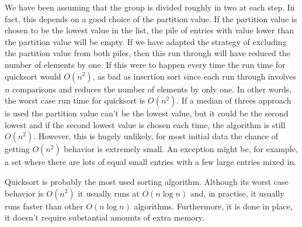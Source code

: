 \documentclass[11pt,a4paper]{scrartcl}
\begin{document}
We have been assuming that the group is divided roughly in two at each
step. In fact, this depends on a good choice of the partition
value. If the partition value is chosen to be the lowest value in the
list, the pile of entries with value lower than the partition value
will be empty. If we have adapted the strategy of excluding the
partition value from both piles, then this run through will have
reduced the number of elements by one. If this were to happen every
time the run time for quicksort would $O(n^2)$, as bad as insertion
sort since each run through involves $n$ comparisons and reduces the
number of elements by only one. In other words, the worst case run
time for quicksort is $O(n^2)$. If a median of threes approach is used
the partition value can't be the lowest value, but it could be the
second lowest and if the second lowest value is chosen each time, the
algorithm is still $O(n^2)$. However, this is hugely unlikely, for
most initial data the chance of getting $O(n^2)$ behavior is extremely
small. An exception might be, for example, a set where there are lots
of equal small entries with a few large entries mixed in.

Quicksort is probably the most used sorting algorithm. Although its
worst case behavior is $O(n^2)$ it usually runs at $O(n\log{n})$ and,
in practise, it usually runs faster than other $O(n\log{n})$
algorithms. Furthermore, it is done in place, it doesn't require
substantial amounts of extra memory.
\end{document}
